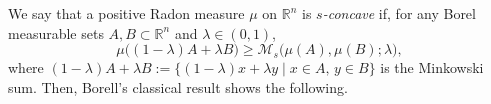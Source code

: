 \documentclass[sts]{imsart}
\newtheorem{proposition}[theorem]{Proposition}
\theoremstyle{definition}
\theoremstyle{remark}
\newcommand{\R}{\mathbb{R}}
\newcommand*\diff{\mathop{}\!\mathrm{d}}
\begin{document}
%
%
%
%
We say that a positive Radon measure $\mu$ on $\R^n$ is \emph{$s$-concave} if, for any Borel measurable sets $A,B \subset \R^n$ and $\lambda \in (0,1)$,
\[
\mu\bigl( (1-\lambda)A+\lambda B \bigr)
\ge \mathcal{M}_s \bigl( \mu(A),\mu(B) ;\lambda \bigr),
\]
where $(1-\lambda)A+\lambda B:=\{ (1-\lambda)x+\lambda y \mid x \in A,\, y \in B \}$ is the Minkowski sum.
Then, Borell's classical result \cite[Theorem~3.2]{Borell} shows the following.
\end{document}
